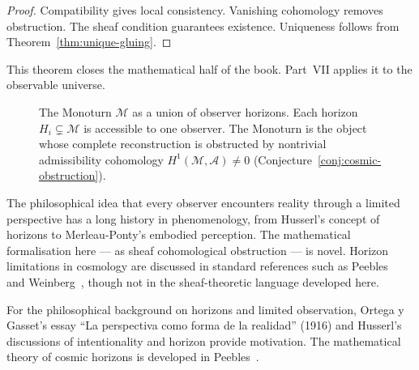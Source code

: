 \begin{proof}
  Compatibility gives local consistency.
  Vanishing cohomology removes obstruction.
  The sheaf condition guarantees existence.
  Uniqueness follows from Theorem~\ref{thm:unique-gluing}.
\end{proof}

This theorem closes the mathematical half of the book.
Part~VII applies it to the observable universe.


\begin{figure}[ht]
\centering
{}
\caption{The Monoturn $\mathcal{M}$ as a union of observer horizons.
         Each horizon $H_i \subsetneq \mathcal{M}$ is accessible to
         one observer.
         The Monoturn is the object whose complete reconstruction is
         obstructed by nontrivial admissibility cohomology
         $H^1(\mathcal{M},\mathcal{A}) \neq 0$
         (Conjecture~\ref{conj:cosmic-obstruction}).}
\label{fig:monoturn}
\end{figure}

\begin{CitationAnchor}
  The philosophical idea that every observer encounters reality
  through a limited perspective has a long history in
  phenomenology, from Husserl's concept of horizons to
  Merleau-Ponty's embodied perception.
  The mathematical formalisation here --- as sheaf cohomological
  obstruction --- is novel.
  Horizon limitations in cosmology are discussed in standard
  references such as Peebles~\cite{peebles1993} and
  Weinberg~\cite{weinberg2008}, though not in the sheaf-theoretic
  language developed here.
\end{CitationAnchor}

\begin{FurtherReading}
  For the philosophical background on horizons and limited
  observation, Ortega y Gasset's essay ``La perspectiva como
  forma de la realidad'' (1916) and Husserl's discussions of
  intentionality and horizon provide motivation.
  The mathematical theory of cosmic horizons is developed in
  Peebles~\cite{peebles1993}.
\end{FurtherReading}

